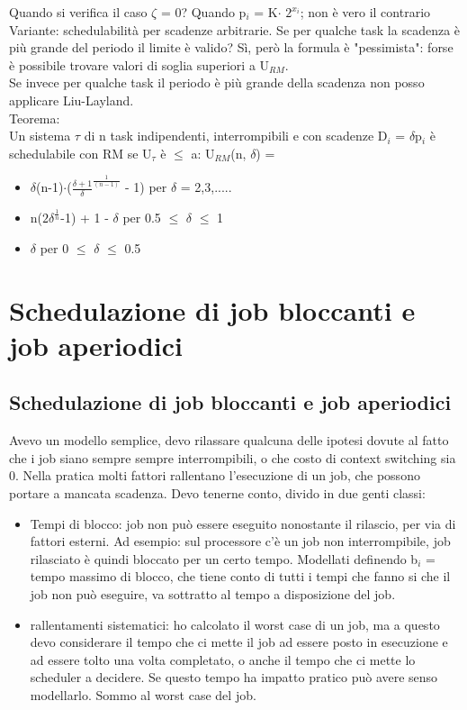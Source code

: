 \documentclass[12pt, oneside]{extbook}
\begin{document}
Quando si verifica il caso $\zeta$ = 0? Quando p$_{i}$ = K$\cdot$ $2^{x_{i}}$; non è vero il contrario\\
Variante: schedulabilità per scadenze arbitrarie. Se per qualche task la scadenza è più grande del periodo il limite è valido? Sì, però la formula è "pessimista": forse è possibile trovare valori di soglia superiori a U$_{RM}$.\\ Se invece per qualche task il periodo è più grande della scadenza non posso applicare Liu-Layland.\\ Teorema:	\\
Un sistema $\tau$ di n task indipendenti, interrompibili e con scadenze D$_{i}$ = $\delta$p$_{i}$ è schedulabile con RM se U$_{\tau}$ è $\leq$ a:
U$_{RM}$(n, $\delta$) =
\begin{itemize}
\item $\delta$(n-1)$\cdot$($\frac{\delta+1}{\delta}^{\frac{1}{(n-1)}}$ - 1)  per $\delta$ = 2,3,.....
\item n($2\delta^{\frac{1}{n}}$-1) + 1 - $\delta$ per 0.5 $\leq$ $\delta$ $\leq$ 1
\item $\delta$ per 0 $\leq$ $\delta$ $\leq$ 0.5
\end{itemize}
\chapter{Schedulazione di job bloccanti e job aperiodici}
\section{Schedulazione di job bloccanti e job aperiodici}
Avevo un modello semplice, devo rilassare qualcuna delle ipotesi dovute al fatto che i job siano sempre sempre interrompibili, o che costo di context switching sia 0. Nella pratica molti fattori rallentano l'esecuzione di un job, che possono portare a mancata scadenza. Devo tenerne conto, divido in due genti classi:
\begin{itemize}
\item Tempi di blocco: job non può essere eseguito nonostante il rilascio, per via di fattori esterni. Ad esempio: sul processore c'è un job non interrompibile, job rilasciato è quindi bloccato per un certo tempo. Modellati definendo b$_{i}$ = tempo massimo di blocco, che tiene conto di tutti i tempi che fanno si che il job non può eseguire, va sottratto al tempo a disposizione del job.
\item rallentamenti sistematici: ho calcolato il worst case di un job, ma a questo devo considerare il tempo che ci mette il job ad essere posto in esecuzione e ad essere tolto una volta completato, o anche il tempo che ci mette lo scheduler a decidere. Se questo tempo ha impatto pratico può avere senso modellarlo. Sommo al worst case del job.
\end{itemize}
\end{document}
